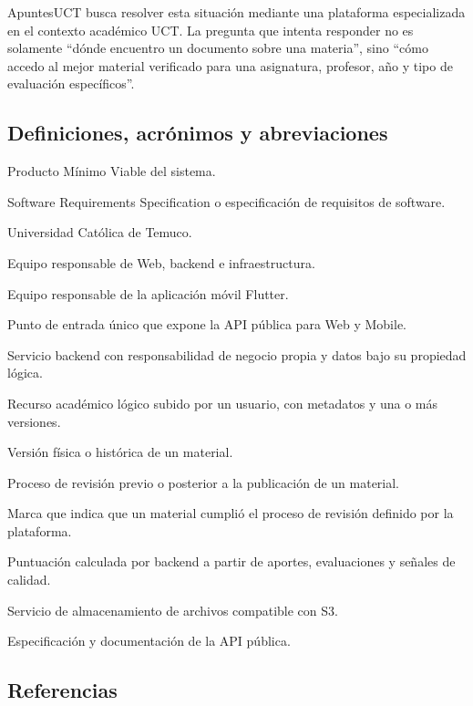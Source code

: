 \documentclass[12pt,a4paper]{article}
\begin{document}
ApuntesUCT busca resolver esta situación mediante una plataforma especializada en el contexto académico UCT. La pregunta que intenta responder no es solamente ``dónde encuentro un documento sobre una materia'', sino ``cómo accedo al mejor material verificado para una asignatura, profesor, año y tipo de evaluación específicos''.

\subsection{Definiciones, acrónimos y abreviaciones}

\begin{description}[leftmargin=3.4cm, style=nextline]
    \item[MVP] Producto Mínimo Viable del sistema.
    \item[SRS] Software Requirements Specification o especificación de requisitos de software.
    \item[UCT] Universidad Católica de Temuco.
    \item[INT2] Equipo responsable de Web, backend e infraestructura.
    \item[INT4] Equipo responsable de la aplicación móvil Flutter.
    \item[API Gateway] Punto de entrada único que expone la API pública para Web y Mobile.
    \item[Microservicio] Servicio backend con responsabilidad de negocio propia y datos bajo su propiedad lógica.
    \item[Material] Recurso académico lógico subido por un usuario, con metadatos y una o más versiones.
    \item[MaterialVersion] Versión física o histórica de un material.
    \item[Moderación] Proceso de revisión previo o posterior a la publicación de un material.
    \item[Verificación] Marca que indica que un material cumplió el proceso de revisión definido por la plataforma.
    \item[Reputación] Puntuación calculada por backend a partir de aportes, evaluaciones y señales de calidad.
    \item[MinIO] Servicio de almacenamiento de archivos compatible con S3.
    \item[OpenAPI/Swagger] Especificación y documentación de la API pública.
\end{description}

\subsection{Referencias}
\end{document}
